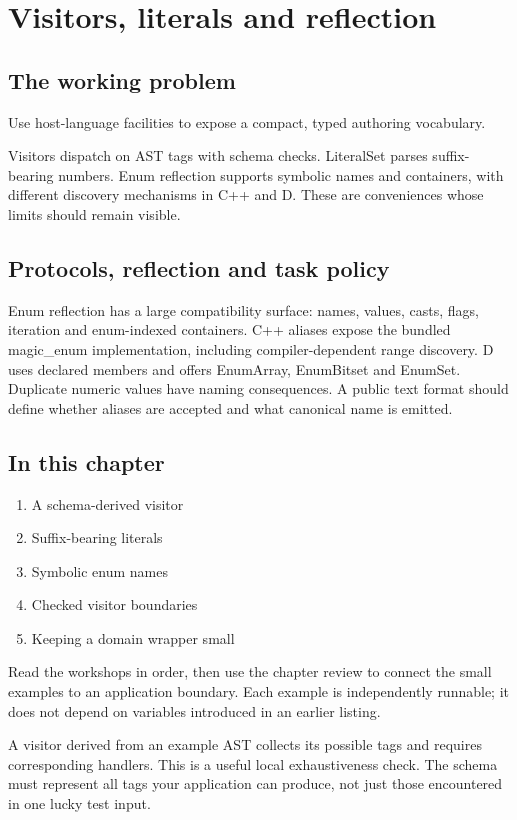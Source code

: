 \chapter{Visitors, literals and reflection}\label{ch:12}
\section*{The working problem}
Use host-language facilities to expose a compact, typed authoring vocabulary.

Visitors dispatch on AST tags with schema checks. LiteralSet parses suffix-bearing numbers. Enum reflection supports symbolic names and containers, with different discovery mechanisms in C++ and D. These are conveniences whose limits should remain visible.

\section*{Protocols, reflection and task policy}
Enum reflection has a large compatibility surface: names, values, casts, flags, iteration and enum-indexed containers. C++ aliases expose the bundled magic\_enum implementation, including compiler-dependent range discovery. D uses declared members and offers EnumArray, EnumBitset and EnumSet. Duplicate numeric values have naming consequences. A public text format should define whether aliases are accepted and what canonical name is emitted.

\section*{In this chapter}
\begin{enumerate}
\item A schema-derived visitor
\item Suffix-bearing literals
\item Symbolic enum names
\item Checked visitor boundaries
\item Keeping a domain wrapper small
\end{enumerate}
Read the workshops in order, then use the chapter review to connect the small examples to an application boundary. Each example is independently runnable; it does not depend on variables introduced in an earlier listing.

\clearpage
{}
A visitor derived from an example AST collects its possible tags and requires corresponding handlers. This is a useful local exhaustiveness check. The schema must represent all tags your application can produce, not just those encountered in one lucky test input.

